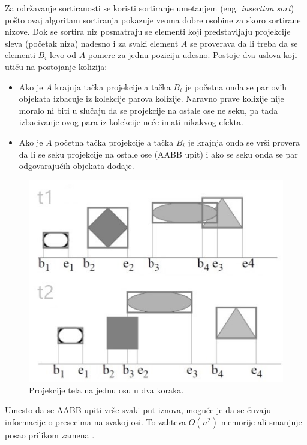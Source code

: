 \documentclass[12pt,oneside]{memoir}
\begin{document}
Za održavanje sortiranosti se koristi sortiranje umetanjem (eng. {\em insertion sort}) 
pošto ovaj algoritam sortiranja pokazuje veoma dobre osobine za skoro sortirane nizove.
Dok se sortira niz posmatraju se elementi koji predstavljaju projekcije sleva (početak niza) nadesno i za svaki element $A$ se proverava da li treba da se elementi $B_i$ levo od $A$
pomere za jednu poziciju udesno. Postoje dva uslova koji utiču na postojanje kolizija:
\begin{itemize}  
	\item Ako je $A$ krajnja tačka projekcije a tačka $B_i$ je početna onda se par ovih objekata izbacuje iz kolekcije parova kolizije.
	Naravno prave kolizije nije moralo ni biti u slučaju da se projekcije na ostale ose ne seku, 
	pa tada izbacivanje ovog para iz kolekcije neće imati nikakvog efekta.
	\item Ako je $A$ početna tačka projekcije a tačka $B_i$ je krajnja onda se vrši provera da li se seku projekcije na ostale ose (AABB upit) i ako se seku
	onda se par odgovarajućih objekata dodaje.

\end{itemize}  


\begin{figure}[h!]
	\begin{center}
	\includegraphics[scale=0.8]{sap.jpg}
	\end{center}
	\caption{Projekcije tela na jednu osu u dva koraka.}
	\label{fig:sap}
\end{figure}

Umesto da se AABB upiti vrše svaki put iznova, moguće je da se čuvaju informacije o presecima 
na svakoj osi. To zahteva $O(n^2)$ memorije ali smanjuje posao prilikom zamena \cite{sap}. 
\end{document}
